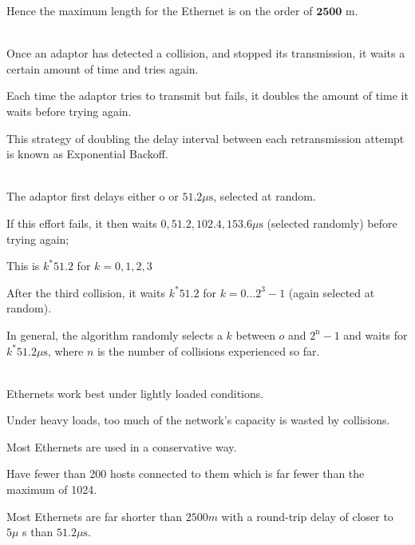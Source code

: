 \begin{description}
\bi
  \ite Hence the maximum length for the Ethernet is on the order of $\mathbf{2 5 0 0}$ $\mathrm{m}$.
\ei


\os{\newpage}\item[{\rot\bf  Ethernet Transmitter Algorithm }]~\\[-3ex]

\bi
  \ite Once an adaptor has detected a collision, and stopped its transmission, it waits a certain amount of time and tries again.

  \ite Each time the adaptor tries to transmit but fails, it doubles the amount of time it waits before trying again.

  \ite This strategy of doubling the delay interval between each retransmission attempt is known as Exponential Backoff.

\ei


\os{\newpage}\item[{\rot\bf  Ethernet Transmitter Algorithm }]~\\[-3ex]

\bi
  \ite The adaptor first delays either o or $51.2 \mu \mathrm{s}$, selected at random.

  \ite If this effort fails, it then waits $0,51.2,102.4,153.6 \mu \mathrm{s}$ (selected randomly) before trying again;

  \ite This is $k^{*} 51.2$ for $k=0,1,2,3$

  \ite After the third collision, it waits $k^{*} 51.2$ for $k=0 \ldots 2^{3}-1$ (again selected at random).

  \ite In general, the algorithm randomly selects a $k$ between $o$ and $2^{\mathrm{n}}-1$ and waits for $k^{*} 51.2 \mu \mathrm{s}$, where $n$ is the number of collisions experienced so far.

\ei


\os{\newpage}\item[{\rot\bf  Experience with Ethernet }]~\\[-3ex]

\bi
  \ite Ethernets work best under lightly loaded conditions.

  \ite Under heavy loads, too much of the network's capacity is wasted by collisions.

  \ite Most Ethernets are used in a conservative way.

  \ite Have fewer than 200 hosts connected to them which is far fewer than the maximum of 1024.

  \ite Most Ethernets are far shorter than $2500 m$ with a round-trip delay of closer to $5 \mu$ s than $51.2 \mu \mathrm{s}$.


\end{description}
